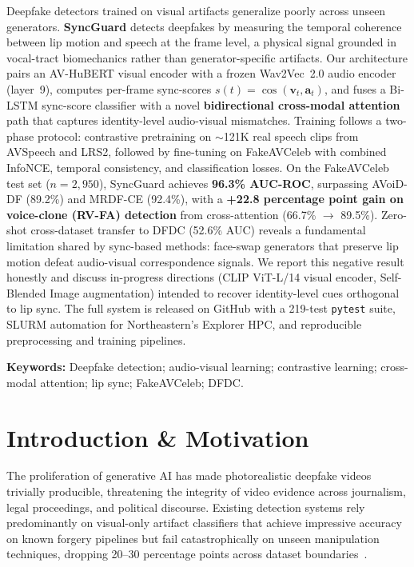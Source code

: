 \documentclass[12pt, letterpaper]{article}
\begin{document}
\noindent
Deepfake detectors trained on visual artifacts generalize poorly across unseen generators. \textbf{SyncGuard} detects deepfakes by measuring the temporal coherence between lip motion and speech at the frame level, a physical signal grounded in vocal-tract biomechanics rather than generator-specific artifacts. Our architecture pairs an AV-HuBERT visual encoder with a frozen Wav2Vec~2.0 audio encoder (layer~9), computes per-frame sync-scores $s(t) = \cos(\mathbf{v}_t, \mathbf{a}_t)$, and fuses a Bi-LSTM sync-score classifier with a novel \textbf{bidirectional cross-modal attention} path that captures identity-level audio-visual mismatches. Training follows a two-phase protocol: contrastive pretraining on $\sim$121K real speech clips from AVSpeech and LRS2, followed by fine-tuning on FakeAVCeleb with combined InfoNCE, temporal consistency, and classification losses. On the FakeAVCeleb test set ($n = 2{,}950$), SyncGuard achieves \textbf{96.3\% AUC-ROC}, surpassing AVoiD-DF (89.2\%) and MRDF-CE (92.4\%), with a \textbf{+22.8 percentage point gain on voice-clone (RV-FA) detection} from cross-attention (66.7\% $\to$ 89.5\%). Zero-shot cross-dataset transfer to DFDC (52.6\% AUC) reveals a fundamental limitation shared by sync-based methods: face-swap generators that preserve lip motion defeat audio-visual correspondence signals. We report this negative result honestly and discuss in-progress directions (CLIP ViT-L/14 visual encoder, Self-Blended Image augmentation) intended to recover identity-level cues orthogonal to lip sync. The full system is released on GitHub with a 219-test \texttt{pytest} suite, SLURM automation for Northeastern's Explorer HPC, and reproducible preprocessing and training pipelines.

\vspace{0.5cm}
\noindent\textbf{Keywords:} Deepfake detection; audio-visual learning; contrastive learning; cross-modal attention; lip sync; FakeAVCeleb; DFDC.

\newpage

\tableofcontents
\newpage

\section{Introduction \& Motivation}

The proliferation of generative AI has made photorealistic deepfake videos trivially producible, threatening the integrity of video evidence across journalism, legal proceedings, and political discourse. Existing detection systems rely predominantly on visual-only artifact classifiers that achieve impressive accuracy on known forgery pipelines but fail catastrophically on unseen manipulation techniques, dropping 20--30 percentage points across dataset boundaries~\cite{rossler2019, yermakov2026}.
\end{document}
